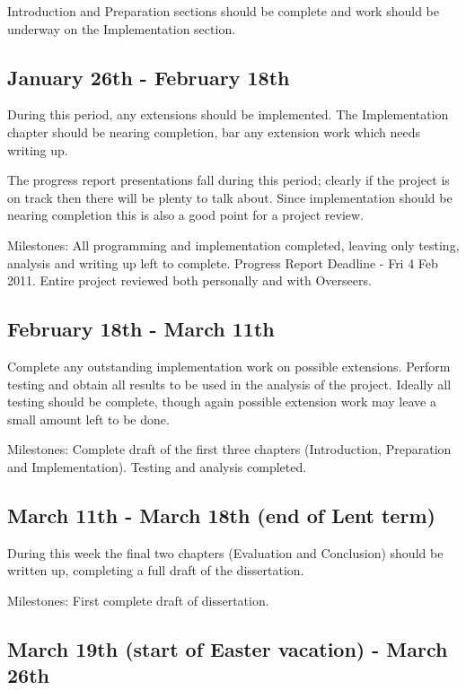 \documentclass[12pt]{article}
\begin{document}
Introduction and Preparation sections should be complete and work should be underway on the Implementation section.

\subsection*{January 26th - February 18th }

During this period, any extensions should be implemented. The Implementation chapter should be nearing completion, bar any extension work which needs writing up.

The progress report presentations fall during this period; clearly if the project is on track then there will be plenty to talk about. Since implementation should be nearing completion this is also a good point for a project review.

Milestones: All programming and implementation completed, leaving only testing, analysis and writing up left to complete. Progress Report Deadline - Fri 4 Feb 2011. Entire project reviewed both personally and with Overseers.


\subsection*{February 18th - March 11th}

Complete any outstanding implementation work on possible extensions. Perform testing and obtain all results to be used in the analysis of the project. Ideally all testing should be complete, though again possible extension work may leave a small amount left to be done.

Milestones: Complete draft of the first three chapters (Introduction, Preparation and Implementation). Testing and analysis completed.

\subsection*{March 11th - March 18th (end of Lent term)}

During this week the final two chapters (Evaluation and Conclusion) should be written up, completing a full draft of the dissertation.

Milestones: First complete draft of dissertation.

\subsection*{March 19th (start of Easter vacation) - March 26th }
\end{document}
